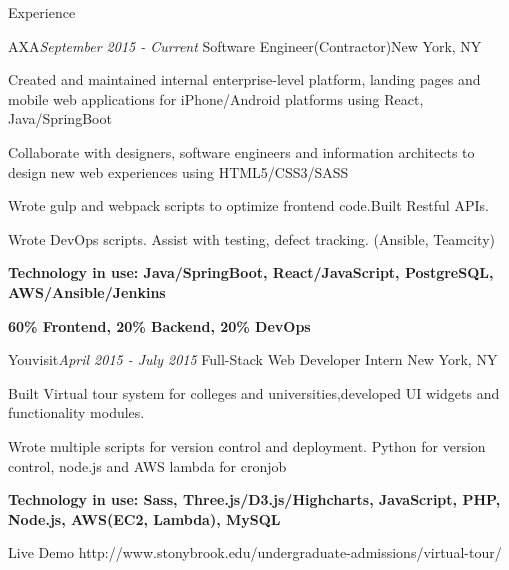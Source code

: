 \documentclass{resume} %
\begin{document}
\begin{rSection}{Experience}
\begin{rSubsection}{AXA}{\em September 2015 - Current }{Software Engineer(Contractor)}{New York, NY}
\item Created and maintained internal enterprise-level platform, landing pages and mobile web applications for iPhone/Android platforms using React, Java/SpringBoot
\item Collaborate with designers, software engineers and information architects to design new web experiences using HTML5/CSS3/SASS
\item Wrote gulp and webpack scripts to optimize frontend code.Built Restful APIs.
\item Wrote DevOps scripts. Assist with testing, defect tracking. (Ansible, Teamcity)
\item {\bf Technology in use: Java/SpringBoot, React/JavaScript, PostgreSQL, AWS/Ansible/Jenkins }
\item {\bf 60\% Frontend, 20\% Backend, 20\% DevOps }

\end{rSubsection}

\begin{rSubsection}{Youvisit}{\em April 2015 - July 2015 }{Full-Stack Web Developer Intern}{ New York, NY}
\item Built Virtual tour system for colleges and universities,developed UI widgets and functionality modules.
\item Wrote multiple scripts for version control and deployment. Python for version control, node.js and AWS lambda for cronjob
\item {\bf Technology in use: Sass, Three.js/D3.js/Highcharts, JavaScript, PHP, Node.js, AWS(EC2, Lambda), MySQL}

\item Live Demo http://www.stonybrook.edu/undergraduate-admissions/virtual-tour/
\end{rSubsection}



\end{rSection}
\end{document}
